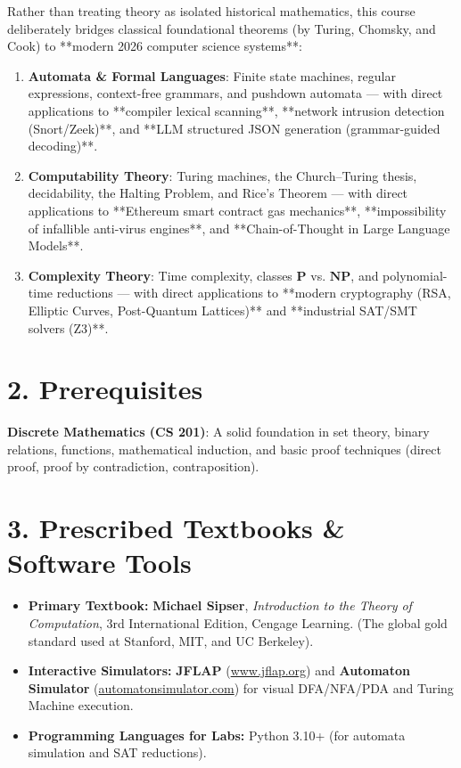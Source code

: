 \documentclass[11pt,a4paper]{article}
\begin{document}
Rather than treating theory as isolated historical mathematics, this course deliberately bridges classical foundational theorems (by Turing, Chomsky, and Cook) to **modern 2026 computer science systems**:
\begin{enumerate}[label=\textbf{(\alph*)}, leftmargin=1.8em, itemsep=1pt, topsep=2pt]
    \item \textbf{Automata \& Formal Languages}: Finite state machines, regular expressions, context-free grammars, and pushdown automata --- with direct applications to **compiler lexical scanning**, **network intrusion detection (Snort/Zeek)**, and **LLM structured JSON generation (grammar-guided decoding)**.
    \item \textbf{Computability Theory}: Turing machines, the Church--Turing thesis, decidability, the Halting Problem, and Rice's Theorem --- with direct applications to **Ethereum smart contract gas mechanics**, **impossibility of infallible anti-virus engines**, and **Chain-of-Thought in Large Language Models**.
    \item \textbf{Complexity Theory}: Time complexity, classes $\mathbf{P}$ vs. $\mathbf{NP}$, and polynomial-time reductions --- with direct applications to **modern cryptography (RSA, Elliptic Curves, Post-Quantum Lattices)** and **industrial SAT/SMT solvers (Z3)**.
\end{enumerate}

\section*{2. Prerequisites}
\begin{tcolorbox}[colback=white, colframe=gimpaaccent, title=Required Background Knowledge]
\textbf{Discrete Mathematics (CS 201)}: A solid foundation in set theory, binary relations, functions, mathematical induction, and basic proof techniques (direct proof, proof by contradiction, contraposition). 
\end{tcolorbox}

\section*{3. Prescribed Textbooks \& Software Tools}
\begin{itemize}[label=\small$\blacksquare$, leftmargin=1.2em, itemsep=2pt]
    \item \textbf{Primary Textbook:} \textbf{Michael Sipser}, \textit{Introduction to the Theory of Computation}, 3rd International Edition, Cengage Learning. (The global gold standard used at Stanford, MIT, and UC Berkeley).
    \item \textbf{Interactive Simulators:} \textbf{JFLAP} (\url{www.jflap.org}) and \textbf{Automaton Simulator} (\url{automatonsimulator.com}) for visual DFA/NFA/PDA and Turing Machine execution.
    \item \textbf{Programming Languages for Labs:} Python 3.10+ (for automata simulation and SAT reductions).
\end{itemize}
\end{document}
